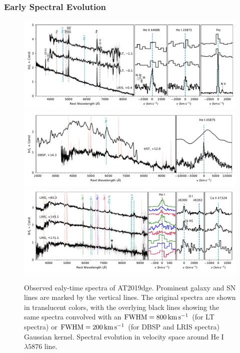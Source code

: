 \documentclass[twocolumn]{aastex63}
\def\ion#1#2{#1$\;${\footnotesize\rm{#2}}\relax}
\begin{document}
\begin{CJK*}{UTF8}{gbsn}
\subsubsection{Early Spectral Evolution}
\begin{figure}[htbp!]
	\centering
	\includegraphics[width=\textwidth]{figures/spectra_early.pdf}
	\includegraphics[width=\textwidth]{figures/spectra_phot.pdf}
	\includegraphics[width=\textwidth]{figures/spectra_late.pdf}
	\caption{Observed ealy-time spectra of AT2019dge. Prominent galaxy and SN lines are marked 
		by the vertical lines. The original spectra are shown in translucent colors, with the overlying black 
		lines showing the same spectra convolved with an ${\rm FWHM} = 800\, {\rm km\, s^{-1}}$ (for LT 
		spectra) or ${\rm FWHM} = 200\, {\rm km\, s^{-1}}$ (for DBSP and LRIS spectra) Gaussian kernel. 
	Spectral evolution in velocity space around \ion{He}{I} $\lambda5876$ line. 
		\label{fig:spectra}}
\end{figure}



\end{CJK*}
\end{document}
